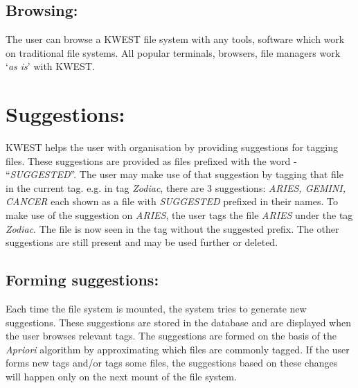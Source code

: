 \subsection{Browsing:} 
The user can browse a KWEST file system with any tools, software which work on traditional file systems. All popular terminals, browsers, file managers work `\textit{as is}' with KWEST. 


\section{Suggestions:}
KWEST helps the user with organisation by providing suggestions for tagging files. These suggestions are provided as files prefixed with the word - ``\textit{SUGGESTED}''. The user may make use of that suggestion by tagging that file in the current tag. \newline
e.g. in tag \textit{Zodiac}, there are 3 suggestions: \textit{ARIES, GEMINI, CANCER} each shown as a file with \textit{SUGGESTED} prefixed in their names. To make use of the suggestion on \textit{ARIES}, the user tags the file \textit{ARIES} under the tag \textit{Zodiac}. The file is now seen in the tag without the suggested prefix. The other suggestions are still present and may be used further or deleted.

\subsection{Forming suggestions:}
Each time the file system is mounted, the system tries to generate new suggestions. These suggestions are stored in the database and are displayed when the user browses relevant tags. The suggestions are formed on the basis of the \textit{Apriori} algorithm by approximating which files are commonly tagged. If the user forms new tags and/or tags some files, the suggestions based on these changes will happen only on the next mount of the file system.

